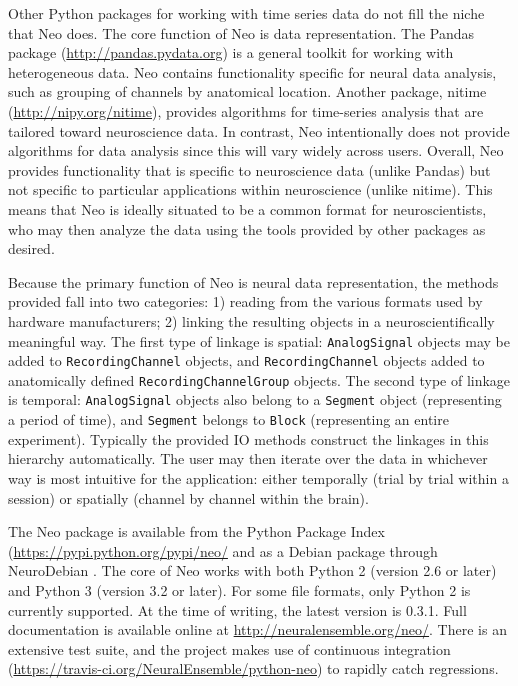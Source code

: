 \documentclass{frontiers}
\newcommand{\documentation}{\url{http://neuralensemble.org/neo/}}
\begin{document}
Other Python packages for working with time series data do not fill the niche that Neo does. 
The core function of Neo is data representation. 
The Pandas package (\url{http://pandas.pydata.org}) is a general toolkit for working with heterogeneous data. 
Neo contains functionality specific for neural data analysis, such as grouping of channels by anatomical location.
Another package, nitime (\url{http://nipy.org/nitime}), provides algorithms for time-series analysis that are tailored toward neuroscience data.
In contrast, Neo intentionally does not provide algorithms for data analysis since this will vary widely across users.
Overall, Neo provides functionality that is specific to neuroscience data (unlike Pandas) but not specific to particular applications within neuroscience (unlike nitime).
This means that Neo is ideally situated to be a common format for neuroscientists, who may then analyze the data using the tools provided by other packages as desired.

Because the primary function of Neo is neural data representation, the methods provided fall into two categories: 1) reading from the various formats used by hardware manufacturers; 2) linking the resulting objects in a neuroscientifically meaningful way.
The first type of linkage is spatial: \lstinline`AnalogSignal` objects may be added to \lstinline`RecordingChannel` objects, and \lstinline`RecordingChannel` objects added to anatomically defined \lstinline`RecordingChannelGroup` objects.
The second type of linkage is temporal: \lstinline`AnalogSignal` objects also belong to a \lstinline`Segment` object (representing a period of time), and \lstinline`Segment` belongs to \lstinline`Block` (representing an entire experiment).
Typically the provided IO methods construct the linkages in this hierarchy automatically.
The user may then iterate over the data in whichever way is most intuitive for the application: either temporally (trial by trial within a session) or spatially (channel by channel within the brain).

The Neo package is available from the Python Package Index (\url{https://pypi.python.org/pypi/neo/} and as a Debian package through NeuroDebian \citep{Halchenko2012}.
The core of Neo works with both Python 2 (version 2.6 or later) and Python 3 (version 3.2 or later).
For some file formats, only Python 2 is currently supported. At the time of writing, the latest version is 0.3.1.
Full documentation is available online at \documentation.
There is an extensive test suite, and the project makes use of continuous integration (\url{https://travis-ci.org/NeuralEnsemble/python-neo}) to rapidly catch regressions.
\end{document}
